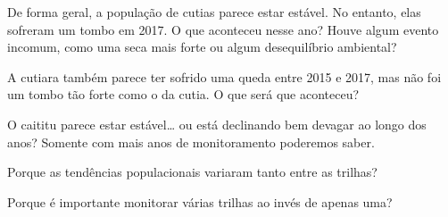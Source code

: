 \documentclass[]{tufte-handout}
\begin{document}
De forma geral, a população de cutias parece estar estável. No entanto,
elas sofreram um tombo em 2017. O que aconteceu nesse ano? Houve algum
evento incomum, como uma seca mais forte ou algum desequilíbrio
ambiental?

A cutiara também parece ter sofrido uma queda entre 2015 e 2017, mas não
foi um tombo tão forte como o da cutia. O que será que aconteceu?

O caititu parece estar estável\ldots{} ou está declinando bem devagar ao
longo dos anos? Somente com mais anos de monitoramento poderemos saber.

Porque as tendências populacionais variaram tanto entre as trilhas?

Porque é importante monitorar várias trilhas ao invés de apenas uma?


\end{document}
